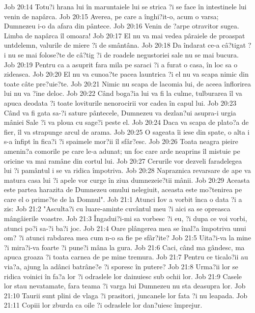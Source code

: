 Job 20:14  Totu?i hrana lui în maruntaiele lui se strica ?i se face în intestinele lui venin de napârca.
Job 20:15  Averea, pe care a înghi?it-o, acum o varsa; Dumnezeu i-o da afara din pântece.
Job 20:16  Venin de ?arpe otravitor sugea. Limba de napârca îl omoara!
Job 20:17  El nu va mai vedea pâraiele de proaspat untdelemn, valurile de miere ?i de smântâna.
Job 20:18  Da îndarat ce-a câ?tigat ?i nu se mai folose?te de câ?tig ?i de roadele negustoriei sale nu se mai bucura.
Job 20:19  Pentru ca a asuprit fara mila pe saraci ?i a furat o casa, în loc sa o zideasca.
Job 20:20  El nu va cunoa?te pacea launtrica ?i el nu va scapa nimic din toate câte pre?uie?te.
Job 20:21  Nimic nu scapa de lacomia lui, de aceea înflorirea lui nu va ?ine deloc.
Job 20:22  Când boga?ia lui va fi la culme, tulburarea îl va apuca deodata ?i toate loviturile nenorocirii vor cadea în capul lui.
Job 20:23  Când va fi gata sa-?i sature pântecele, Dumnezeu va dezlan?ui asupra-i urgia mâniei Sale ?i va ploua cu sage?i peste el.
Job 20:24  Daca va scapa de plato?a de fier, îl va strapunge arcul de arama.
Job 20:25  O sageata îi iese din spate, o alta i s-a înfipt în fica?i ?i spaimele mor?ii îl sfâr?esc.
Job 20:26  Toata neagra pieire amenin?a comorile pe care le-a adunat; un foc care arde neaprins îl mistuie pe oricine va mai ramâne din cortul lui.
Job 20:27  Cerurile vor dezveli faradelegea lui ?i pamântul i se va ridica împotriva.
Job 20:28  Napraznica revarsare de ape va matura casa lui ?i apele vor curge în ziua dumnezeie?tii mânii.
Job 20:29  Aceasta este partea harazita de Dumnezeu omului nelegiuit, aceasta este mo?tenirea pe care el o prime?te de la Domnul".
Job 21:1  Atunci Iov a vorbit înca o data ?i a zis:
Job 21:2  "Asculta?i cu luare-aminte cuvântul meu ?i aici sa se opreasca mângâierile voastre.
Job 21:3  Îngadui?i-mi sa vorbesc ?i eu, ?i dupa ce voi vorbi, atunci po?i sa-?i ba?i joc.
Job 21:4  Oare plângerea mea se înal?a împotriva unui om? ?i atunci rabdarea mea cum n-o sa fie pe sfâr?ite?
Job 21:5  Uita?i-va la mine ?i mira?i-va foarte ?i pune?i mâna la gura.
Job 21:6  Caci, când ma gândesc, ma apuca groaza ?i toata carnea de pe mine tremura.
Job 21:7  Pentru ce ticalo?ii au via?a, ajung la adânci batrâne?e ?i sporesc în putere?
Job 21:8  Urma?ii lor se ridica voinici în fa?a lor ?i odraslele lor dainuiesc sub ochii lor.
Job 21:9  Casele lor stau nevatamate, fara teama ?i varga lui Dumnezeu nu sta deasupra lor.
Job 21:10  Taurii sunt plini de vlaga ?i prasitori, juncanele lor fata ?i nu leapada.
Job 21:11  Copiii lor zburda ca oile ?i odraslele lor dan?uiesc împrejur.
